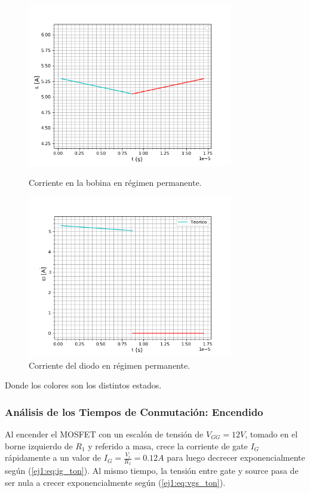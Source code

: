 \begin{figure}[H]
	\centering
	\begin{minipage}{0.495\textwidth}
		\centering
		\includegraphics[width=0.8\textwidth]{ImagenesEjercicio-1/IL_permanente} %
		\caption{Corriente en la bobina en régimen permanente.}
		\label{ej1:fig:il_permanente}
	\end{minipage}\hfill
	\begin{minipage}{0.495\textwidth}
		\centering
		\includegraphics[width=0.8\textwidth]{ImagenesEjercicio-1/ID_apagado_a_encendido} %
		\caption{Corriente del diodo en régimen permanente.}
		\label{ej1:fig:idiodo_permanente}
	\end{minipage}
\end{figure}
Donde los colores son los distintos estados.

\subsubsection{Análisis de los Tiempos de Conmutación: Encendido}
Al encender el MOSFET con un escalón de tensión de $V_{GG} = 12V$, tomado en el borne izquierdo de $R_1$ y referido a masa, crece la corriente de gate $I_G$ rápidamente a un valor de $I_G = \frac{V_i}{R_1} = 0.12A$ para luego decrecer exponencialmente según (\ref{ej1:eq:ig_ton}). Al mismo tiempo, la tensión entre gate y source pasa de ser nula a crecer exponencialmente según (\ref{ej1:eq:vgs_ton}).

